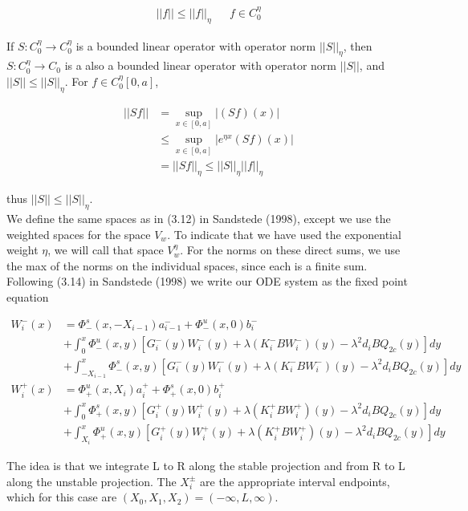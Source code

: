 \documentclass[12pt]{article}
\begin{document}
\begin{align*}
||f|| \leq ||f||_\eta && f \in C_0^\eta
\end{align*}

If $S: C_0^\eta \rightarrow C_0^\eta$ is a bounded linear operator with operator norm $||S||_\eta$, then $S: C_0^\eta \rightarrow C_0$ is a also a bounded linear operator with operator norm $||S||$, and $||S|| \leq ||S||_\eta$. For $f \in C_0^\eta[0,a]$,

\begin{align*}
||S f|| &= \sup_{x \in [0,a]} | (S f)(x) | \\
& \leq \sup_{x \in [0,a]} | e^{\eta x} (S f)(x) | \\
&= || S f ||_\eta \leq ||S||_\eta ||f||_\eta
\end{align*}

thus $||S|| \leq ||S||_\eta$.\\
 
We define the same spaces as in (3.12) in Sandstede (1998), except we use the weighted spaces for the space $V_w$. To indicate that we have used the exponential weight $\eta$, we will call that space $V_w^\eta$. For the norms on these direct sums, we use the max of the norms on the individual spaces, since each is a finite sum.\\

Following (3.14) in Sandstede (1998) we write our ODE system as the fixed point equation

\begin{align*}
W_i^-(x) &= \Phi^s_-(x, -X_{i-1})a^-_{i-1} + \Phi^u_-(x, 0)b_i^- \\
&+ \int_0^x \Phi^u_-(x, y)[G_i^-(y) W_i^-(y) + \lambda (K_i^- B W_i^-)(y) - \lambda^2 d_i B Q_{2c}(y) ] dy \\
&+ \int_{-X_{i-1}}^x \Phi^s_-(x, y)[G_i^-(y) W_i^-(y) + \lambda (K_i^-B W_i^-)(y) - \lambda^2 d_i B Q_{2c}(y) ] dy \\
W_i^+(x) &= \Phi^u_+(x, X_i)a^+_{i} + \Phi^s_+(x, 0)b_i^+ \\
&+ \int_0^x \Phi^s_+(x, y)[G_i^+(y) W_i^+(y) + \lambda (K_i^+ B W_i^+)(y) - \lambda^2 d_i B Q_{2c}(y) ] dy \\
&+ \int_{X_{i}}^x \Phi^u_+(x, y)[G_i^+(y) W_i^+(y) + \lambda (K_i^+ B W_i^+)(y) - \lambda^2 d_i B Q_{2c}(y) ] dy
\end{align*}

The idea is that we integrate L to R along the stable projection and from R to L along the unstable projection. The $X_i^\pm$ are the appropriate interval endpoints, which for this case are $(X_0, X_1, X_2) = (-\infty, L, \infty)$.\\
\end{document}
